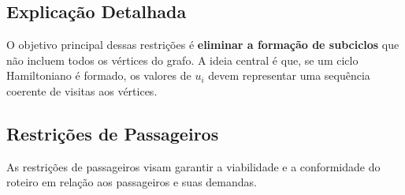 \documentclass[12pt, a4paper]{report}
\begin{document}
\subsection*{Explicação Detalhada}
\noindent O objetivo principal dessas restrições é \textbf{eliminar a formação de subciclos} que não incluem todos os vértices do grafo. A ideia central é que, se um ciclo Hamiltoniano é formado, os valores de $u_i$ devem representar uma sequência coerente de visitas aos vértices.


\subsection{Restrições de Passageiros}
As restrições de passageiros visam garantir a viabilidade e a conformidade do roteiro em relação aos passageiros e suas demandas.
\end{document}
